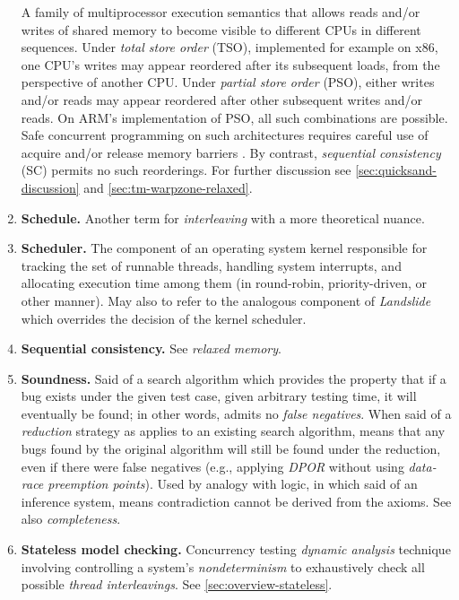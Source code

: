 \begin{enumerate}
{		A family of multiprocessor execution semantics
		that allows reads and/or writes of shared memory to become visible to different CPUs in different sequences.
		Under {\em total store order} (TSO),
		implemented for example on x86,
		one CPU's writes may appear reordered after its subsequent loads, from the perspective of another CPU.
		Under {\em partial store order} (PSO),
		either writes and/or reads may appear reordered after other subsequent writes and/or reads.
		On ARM's implementation of PSO, all such combinations are possible.
		Safe concurrent programming on such architectures requires careful use
		of acquire and/or release memory barriers
		\cite{sully-thesis}.
		By contrast, {\em sequential consistency} (SC) permits no such reorderings.
		For further discussion see \cref{sec:quicksand-discussion} and \cref{sec:tm-warpzone-relaxed}.}
	\item {\bf Schedule.}
		Another term for {\em interleaving} with a more theoretical nuance.
	\item {\bf Scheduler.}
		The component of an operating system kernel responsible for tracking the set of runnable threads,
		handling system interrupts,
		and allocating execution time among them (in round-robin, priority-driven, or other manner).
		May also to refer to the analogous component of {\em Landslide}
		which overrides the decision of the kernel scheduler.
	\item {\bf Sequential consistency.} See {\em relaxed memory}.
	\item {\bf Soundness.}
		Said of a search algorithm
		which provides the property that if a bug exists under the given test case,
		given arbitrary testing time,
		it will eventually be found;
		in other words, admits no {\em false negatives}.
		When said of a {\em reduction} strategy as applies to an existing search algorithm,
		means that any bugs found by the original algorithm will still be found under the reduction,
		even if there were false negatives
		(e.g., applying {\em DPOR} without using {\em data-race preemption points}).
		Used by analogy with logic, in which said of an inference system,
		means contradiction cannot be derived from the axioms.
		See also {\em completeness}.
	\item {\bf Stateless model checking.}
		Concurrency testing {\em dynamic analysis} technique involving controlling a system's {\em nondeterminism}
		to exhaustively check all possible {\em thread interleavings}.
		See \cref{sec:overview-stateless}.

\end{enumerate}

